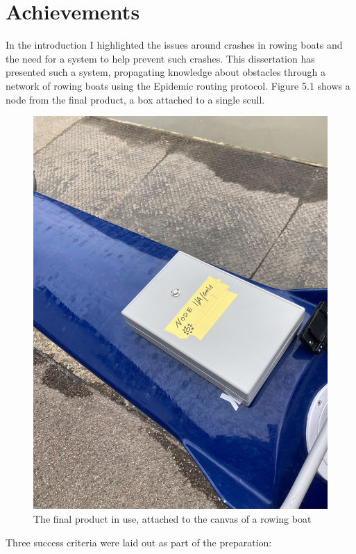 \documentclass[12pt,a4paper]{report}
\begin{document}
\section{Achievements}
In the introduction I highlighted the issues around crashes in rowing boats and the need for a system to help prevent such crashes. This dissertation has presented such a system, propagating knowledge about obstacles through a network of rowing boats using the Epidemic routing protocol. Figure 5.1 shows a node from the final product, a box attached to a single scull.
\begin{figure}[h]
\begin{center}
\includegraphics[scale=0.15]{boxOnBoat.jpeg}
\end{center}
\caption{The final product in use, attached to the canvas of a rowing boat}
\end{figure}
\FloatBarrier
Three success criteria were laid out as part of the preparation: \\
\end{document}
